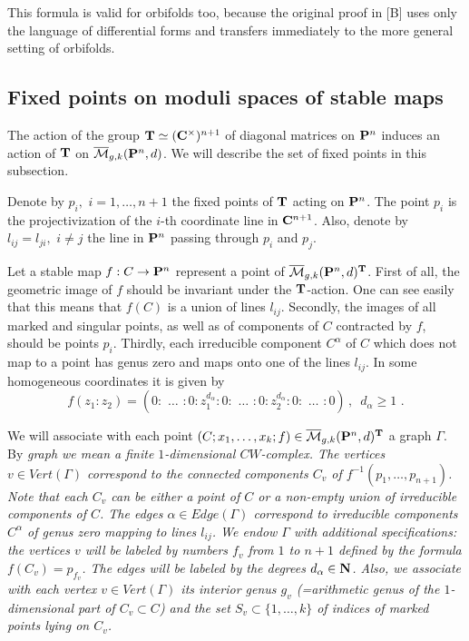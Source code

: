 \documentclass{amsart}
\begin{document}
This formula is valid for orbifolds too, because the original proof
 in [B] uses only the language of differential forms and
 transfers immediately to the more general setting of orbifolds.

\subsection{Fixed points on moduli spaces of stable maps}

The action of the group $\T\simeq(\C^{\times})^{n+1}$ of diagonal matrices on
$\P^n$ induces
 an action of $\T$ on $\M_{g,k}(\P^n,d)$. We will describe the set of fixed
points in this subsection.

Denote by $p_i,\,\,i=1,\dots ,n+1$ the fixed points of $\T$ acting on $\P^n$.
The point $p_i$ is the projectivization of the $i$-th coordinate line in
$\C^{n+1}$. Also, denote by $l_{ij}=l_{ji},\,\,i\ne j$
 the line in $\P^n$ passing through $p_i$ and $p_j$.


Let a stable map
 $f:C\to \P^n$ represent a point of $\M_{g,k}(\P^n,d)^{\T}$. First of all, the
geometric image of $f$ should be invariant under the $\T$-action.
 One can see easily that this means that $f(C)$ is a union of lines $l_{ij}$.
Secondly, the images of all marked and singular points, as well as of
components of $C$ contracted by $f$,
 should be points $p_i$. Thirdly,
  each irreducible component $C^{\alpha}$ of $C$ which does not map to a point
has genus zero and maps onto one of the lines $l_{ij}$. In some homogeneous
coordinates it is given by
$$f(z_1:z_2)=(0:\,\,\dots\,\,:0:z_1^{d_{\alpha}}:0:\,\,\dots\,\,:0:z_2^{d_{\alpha}}:0:\,\,\dots\,\,:0)\,,\,\,\,{d_{\alpha}}\ge1\,\,.$$

We will associate  with each point
$(C;{x_1,\dots,x_k};f)\in\M_{g,k}(\P^n,d)^{\T}$
 a graph $\Gamma$. By \it graph \rm we mean a finite $1$-dimensional
$CW$-complex.
 The vertices $v\in Vert(\Gamma)$ correspond to the  connected components
$C_{v}$ of $f^{-1}({p_1,\dots,p_{n+1}})$. Note that each $C_v$ can be either a
point of $C$ or a non-empty union of irreducible components of $C$. The edges
$\alpha\in Edge(\Gamma)$ correspond to irreducible components $C^{\alpha}$ of
genus zero mapping to lines $l_{ij}$.
  We  endow $\Gamma$ with additional specifications:
 the vertices $v$ will be labeled by numbers $f_v$ from $1$ to $n+1$
 defined by the formula $f(C_v)=p_{f_v}$. The edges will be labeled by the
degrees ${d_{\alpha}}\in\bold N$. Also, we associate with each vertex $v\in
Vert(\Gamma)$ its interior genus $g_v$ (=arithmetic genus of the
$1$-dimensional part of
 $C_v\subset C$) and the set $S_v\subset\{1,\dots,k\}$ of indices of  marked
points lying on $C_v$.
\end{document}
